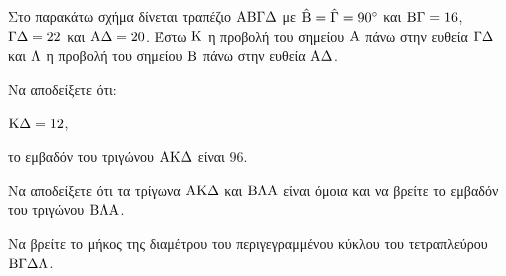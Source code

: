 Στο παρακάτω σχήμα δίνεται τραπέζιο ${\rm AB\Gamma\Delta}$ με $\hat{\rm B} = \hat{\rm \Gamma} = 90^\circ$ και ${\rm B\Gamma} = 16$, ${\rm \Gamma\Delta} = 22$ και ${\rm A\Delta} = 20$. Έστω ${\rm K}$ η προβολή του σημείου ${\rm A}$ πάνω στην ευθεία ${\rm \Gamma\Delta}$ και ${\rm \Lambda}$ η προβολή του σημείου ${\rm B}$ πάνω στην ευθεία ${\rm A\Delta}$.
\begin{alist}
\item Να αποδείξετε ότι:
\begin{rlist}
\item ${\rm K\Delta} = 12$, 
\item το εμβαδόν του τριγώνου ${\rm AK\Delta}$ είναι $96$. 
\end{rlist}
\item Να αποδείξετε ότι τα τρίγωνα ${\rm AK\Delta}$ και ${\rm B\Lambda A}$ είναι όμοια και να βρείτε το εμβαδόν του τριγώνου ${\rm B\Lambda A}$. 
\item Να βρείτε το μήκος της διαμέτρου του περιγεγραμμένου κύκλου του τετραπλεύρου ${\rm B\Gamma\Delta\Lambda}$. 
\end{alist}